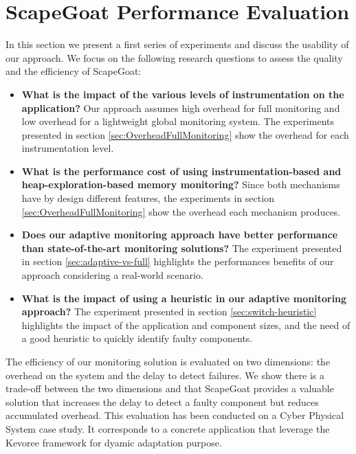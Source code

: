 \section{ScapeGoat Performance Evaluation\label{sec:evaluation}}

In this section we present a first series of experiments and discuss the usability of our approach.
We focus on the following research questions to assess the quality and the efficiency of ScapeGoat:

\begin{itemize}
	\item \textbf{What is the impact of the various levels of instrumentation on the application?}
	Our approach assumes high overhead for full monitoring and low overhead for a lightweight global monitoring system. The experiments presented in section \ref{sec:OverheadFullMonitoring} show the overhead for each instrumentation level.
	\item \textbf{What is the performance cost of using instrumentation-based and heap-exploration-based memory monitoring?}
	Since both mechanisms have by design different features, the experiments in section \ref{sec:OverheadFullMonitoring} show the overhead each mechanism produces. 
	\item \textbf{Does our adaptive monitoring approach have better performance than state-of-the-art monitoring solutions?}
	The experiment presented in section \ref{sec:adaptive-vs-full} highlights the performances benefits of our approach considering a real-world scenario.
	\item \textbf{What is the impact of using a heuristic in our adaptive monitoring approach?}
	The experiment presented in section \ref{sec:switch-heuristic} highlights the impact of the application and component sizes, and the need of a good heuristic to quickly identify faulty components.
\end{itemize}

The efficiency of our monitoring solution is evaluated on two dimensions: the overhead on the system and the delay to detect failures.
We show there is a trade-off between the two dimensions and that ScapeGoat provides a valuable solution that increases the delay to detect a faulty component but reduces accumulated overhead.
This evaluation has been conducted on a Cyber Physical System case study.
It corresponds to a concrete application that leverage the Kevoree framework for dyamic adaptation purpose.


